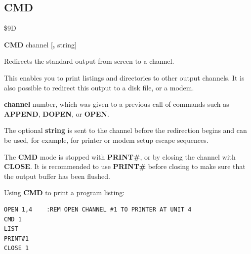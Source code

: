 \subsection{CMD}
\begin{description}[leftmargin=2cm,style=nextline]
\item [Token:] \$9D
\item [Format:] {\bf CMD} channel [{\bf,} string]
\item [Usage:] Redirects the standard output
               from screen to a channel.

               This enables you to
               print listings and directories to other output channels.
               It is also possible to redirect this output to a disk file,
               or a modem.

               {\bf channel} number, which was given to a previous
               call of commands such as {\bf APPEND}, {\bf DOPEN}, or {\bf OPEN}.

               The optional {\bf string} is sent to the channel
               before the redirection begins and can be used,
               for example, for printer or modem setup escape sequences.

\item [Remarks:] The {\bf CMD} mode is stopped with {\bf PRINT\#},
                 or by closing the channel with {\bf CLOSE}.
                 It is recommended to use {\bf PRINT\#}
                 before closing to make sure that the output buffer
                 has been flushed.

\item [Example:] Using {\bf CMD} to print a program listing:
\begin{tcolorbox}[colback=black,coltext=white]
\verbatimfont{\codefont}
\begin{verbatim}
OPEN 1,4    :REM OPEN CHANNEL #1 TO PRINTER AT UNIT 4
CMD 1
LIST
PRINT#1
CLOSE 1
\end{verbatim}
\end{tcolorbox}
\end{description}


\newpage
